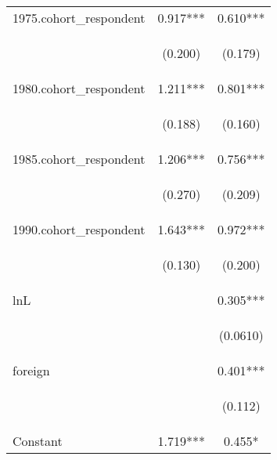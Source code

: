 \begin{center}
\begin{tabular}{lcc}
1975.cohort\_respondent & 0.917*** & 0.610*** \\
\vspace{4pt} & \begin{footnotesize}(0.200)\end{footnotesize} & \begin{footnotesize}(0.179)\end{footnotesize} \\
1980.cohort\_respondent & 1.211*** & 0.801*** \\
\vspace{4pt} & \begin{footnotesize}(0.188)\end{footnotesize} & \begin{footnotesize}(0.160)\end{footnotesize} \\
1985.cohort\_respondent & 1.206*** & 0.756*** \\
\vspace{4pt} & \begin{footnotesize}(0.270)\end{footnotesize} & \begin{footnotesize}(0.209)\end{footnotesize} \\
1990.cohort\_respondent & 1.643*** & 0.972*** \\
\vspace{4pt} & \begin{footnotesize}(0.130)\end{footnotesize} & \begin{footnotesize}(0.200)\end{footnotesize} \\
lnL &  & 0.305*** \\
\vspace{4pt} & \begin{footnotesize}\end{footnotesize} & \begin{footnotesize}(0.0610)\end{footnotesize} \\
foreign &  & 0.401*** \\
\vspace{4pt} & \begin{footnotesize}\end{footnotesize} & \begin{footnotesize}(0.112)\end{footnotesize} \\
Constant & 1.719*** & 0.455* \\

\end{tabular}
\end{center}
